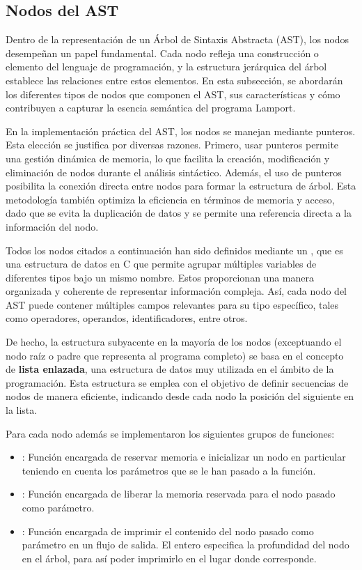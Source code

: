 \subsection{Nodos del AST}
Dentro de la representación de un Árbol de Sintaxis Abstracta (AST), los nodos desempeñan un papel fundamental. Cada nodo refleja una construcción o elemento del lenguaje de programación, y la estructura jerárquica del árbol establece las relaciones entre estos elementos. En esta subsección, se abordarán los diferentes tipos de nodos que componen el AST, sus características y cómo contribuyen a capturar la esencia semántica del programa Lamport.



En la implementación práctica del AST, los nodos se manejan mediante punteros. Esta elección se justifica por diversas razones. Primero, usar punteros permite una gestión dinámica de memoria, lo que facilita la creación, modificación y eliminación de nodos durante el análisis sintáctico. Además, el uso de punteros posibilita la conexión directa entre nodos para formar la estructura de árbol. Esta metodología también optimiza la eficiencia en términos de memoria y acceso, dado que se evita la duplicación de datos y se permite una referencia directa a la información del nodo.


Todos los nodos citados a continuación han sido definidos mediante un , que es una estructura de datos en C que permite agrupar múltiples variables de diferentes tipos bajo un mismo nombre. Estos  proporcionan una manera organizada y coherente de representar información compleja. Así, cada nodo del AST puede contener múltiples campos relevantes para su tipo específico, tales como operadores, operandos, identificadores, entre otros. 


De hecho, la estructura subyacente en la mayoría de los nodos (exceptuando el nodo raíz o padre que representa al programa completo) se basa en el concepto de \textbf{lista enlazada}, una estructura de datos muy utilizada en el ámbito de la programación. Esta estructura se emplea con el objetivo de definir secuencias de nodos de manera eficiente, indicando desde cada nodo la posición del siguiente en la lista.


\noindent
Para cada nodo además se implementaron los siguientes grupos de funciones:

\begin{itemize}
    \item {} : Función encargada de reservar memoria e inicializar un nodo en particular teniendo en cuenta los parámetros que se le han pasado a la función.
    \item {} : Función encargada de liberar la memoria reservada para el nodo pasado como parámetro.
    \item {} : Función encargada de imprimir el contenido del nodo pasado como parámetro en un flujo de salida. El entero  especifica la profundidad del nodo en el árbol, para así poder imprimirlo en el lugar donde corresponde.
\end{itemize}

